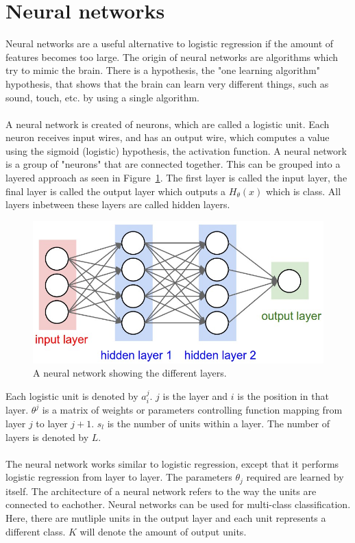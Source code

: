 \section{Neural networks}
\label{neuralnet}
Neural networks are a useful alternative to logistic regression if the amount of features becomes too large. The origin of neural networks are algorithms which try to mimic the brain. There is a hypothesis, the "one learning algorithm" hypothesis, that shows that the brain can learn very different things, such as sound, touch, etc. by using a single algorithm. \cite{neuralnetBrain}\\\\
A neural network is created of neurons, which are called a logistic unit. Each neuron receives input wires, and has an output wire, which computes a value using the sigmoid (logistic) hypothesis, the activation function. A neural network is a group of "neurons" that are connected together. This can be grouped into a layered approach as seen in Figure~\ref{fig:neuralnetwork}. The first layer is called the input layer, the final layer is called the output layer which outputs a $H_\theta(x)$ which is class. All layers inbetween these layers are called hidden layers. \cite{neuralnetModel1}
\begin{figure}[H]
\centering
\includegraphics[width=1\textwidth]{Figures/neuralnet}
\decoRule
\caption[Neural network]{A neural network showing the different layers.\cite{neuralnetwork}}
\label{fig:neuralnetwork}
\end{figure}
\noindent Each logistic unit is denoted by $a_i^j$. $j$ is the layer and $i$ is the position in that layer. $\theta^j$ is a matrix of weights or parameters controlling function mapping from layer $j$ to layer $j+1$. $s_l$ is the number of units within a layer. The number of layers is denoted by $L$.\\\\
The neural network works similar to logistic regression, except that it performs logistic regression from layer to layer. The parameters $\theta_j$ required are learned by itself. The architecture of a neural network refers to the way the units are connected to eachother. Neural networks can be used for multi-class classification. Here, there are mutliple units in the output layer and each unit represents a different class. $K$ will denote the amount of output units. \cite{neuralnetClass}
